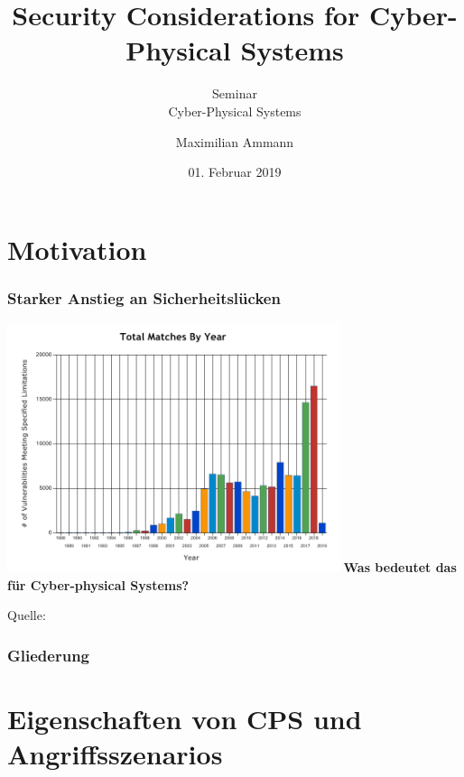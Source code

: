 \documentclass{sikslides}
\title[Security Considerations for CPS]{Security Considerations for Cyber-Physical Systems}
\subtitle{Seminar \\Cyber-Physical Systems} %
\author{Maximilian Ammann}
\date[01.02.2019]{01. Februar 2019}
\begin{document}
    \titleframe

    \section{Motivation}
    \begin{frame}
        \frametitle{Starker Anstieg an Sicherheitslücken}
        \centering
        \begin{center}
            \includegraphics[trim=0 25px 0 25px,height=7.3cm]{figure/nvd_stats.png}
            \textbf{Was bedeutet das für Cyber-physical Systems?}
        \end{center}
        \hfill \tiny Quelle:
    \end{frame}

    \begin{frame}
        \frametitle{Gliederung}
        \tableofcontents[pausesections]
    \end{frame}

    \section{Eigenschaften von CPS und Angriffsszenarios}
\end{document}
